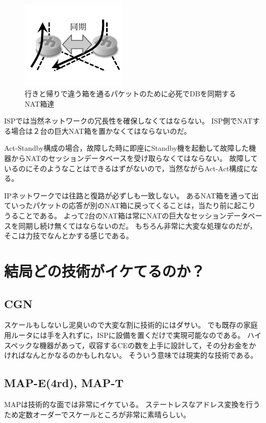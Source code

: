 \begin{figure}
\centering
\includegraphics[bb=0 10 140 109,width=5cm]{./yuyarin/cgn-nat.pdf}
\caption{行きと帰りで違う箱を通るパケットのために必死でDBを同期するNAT箱達}
\end{figure}

ISPでは当然ネットワークの冗長性を確保しなくてはならない。
ISP側でNATする場合は２台の巨大NAT箱を置かなくてはならないのだ。

Act-Standby構成の場合，故障した時に即座にStandby機を起動して故障した機器からNATのセッションデータベースを受け取らなくてはならない。
故障しているのにそのようなことはできるはずがないので，当然ながらAct-Act構成になる。

IPネットワークでは往路と復路が必ずしも一致しない。
あるNAT箱を通って出ていったパケットの応答が別のNAT箱に戻ってくることは，当たり前に起こりうることである。
よって2台のNAT箱は常にNATの巨大なセッションデータベースを同期し続け無くてはならないのだ。
もちろん非常に大変な処理なのだが，そこは力技でなんとかする感じである。

\section{結局どの技術がイケてるのか？}

\subsection{CGN}
スケールもしないし泥臭いので大変な割に技術的にはダサい。
でも既存の家庭用ルータには手を入れずに，ISPに設備を置くだけで実現可能なのである。
ハイスペックな機器があって，収容するCEの数を上手に設計して，その分お金をかければなんとかなるのかもしれない。
そういう意味では現実的な技術である。

\subsection{MAP-E(4rd), MAP-T}
MAPは技術的な面では非常にイケている。
ステートレスなアドレス変換を行うため定数オーダーでスケールところが非常に素晴らしい。

